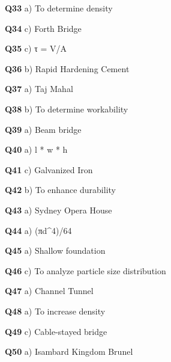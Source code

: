 \textbf{Q33} a) To determine density\par
\textbf{Q34} c) Forth Bridge\par
\textbf{Q35} c) τ = V/A\par
\textbf{Q36} b) Rapid Hardening Cement\par
\textbf{Q37} a) Taj Mahal\par
\textbf{Q38} b) To determine workability\par
\textbf{Q39} a) Beam bridge\par
\textbf{Q40} a) l * w * h\par
\textbf{Q41} c) Galvanized Iron\par
\textbf{Q42} b) To enhance durability\par
\textbf{Q43} a) Sydney Opera House\par
\textbf{Q44} a) (πd^4)/64\par
\textbf{Q45} a) Shallow foundation\par
\textbf{Q46} c) To analyze particle size distribution\par
\textbf{Q47} a) Channel Tunnel\par
\textbf{Q48} a) To increase density\par
\textbf{Q49} c) Cable-stayed bridge\par
\textbf{Q50} a) Isambard Kingdom Brunel\par